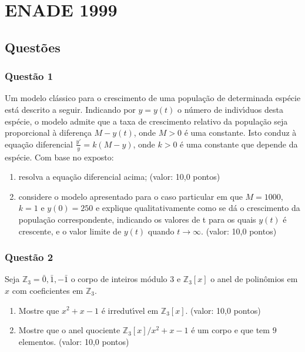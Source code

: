 \chapter{ENADE 1999}

\section{\color{blue} Quest\~oes}

\subsection{\color{blue} Quest\~ao 1}

Um modelo cl\'assico para o crescimento de uma popula\c c\~ao de determinada esp\'ecie est\'a descrito a seguir. Indicando por
$y = y(t)$ o n\'umero de indiv\'\i duos desta esp\'ecie, o modelo admite que a taxa de crescimento relativo da popula\c c\~ao seja proporcional
\`a diferen\c ca $M - y(t)$, onde $M > 0$ \'e uma constante. Isto conduz \`a equa\c c\~ao diferencial $\displaystyle \frac{y'}{y}= k (M - y)$, onde $k > 0$ \'e uma constante que depende da esp\'ecie. Com base no exposto:

\begin{enumerate}

\item[(a)] resolva a equa\c c\~ao diferencial acima; (valor: 10,0 pontos)

\item[(b)] considere o modelo apresentado para o caso particular em que $M = 1000$, $k = 1$ e $y (0) = 250$ e explique qualitativamente como se d\'a o crescimento da popula\c c\~ao correspondente, indicando os valores de t para os quais $y(t)$ \'e crescente, e o valor limite de $y(t)$ quando $t \to \infty$. (valor: 10,0 pontos)

\end{enumerate}

\subsection{\color{blue} Quest\~ao 2}

Seja $\mathbb Z_3 = {\bar 0 , \bar 1 , -\bar 1}$ o corpo de inteiros m\'odulo $3$ e $\mathbb Z_3 [x]$ o anel de polinômios em $x$ com coeficientes em $\mathbb Z_3$.

\begin{enumerate}

\item[(a)] Mostre que $x^2 + x - 1$ \'e irredut\'\i vel em $\mathbb Z_3 [x]$. (valor: 10,0 pontos)

\item[(b)] Mostre que o anel quociente $\displaystyle {\mathbb Z_3 [x]}/{x^2 + x - 1}$ \'e um corpo e que tem $9$ elementos. (valor: 10,0 pontos)

\end{enumerate}

